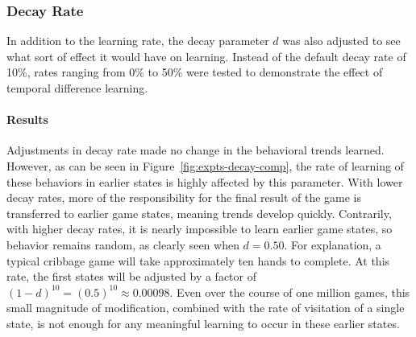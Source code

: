 
\subsubsection*{Decay Rate}
\label{sec:findings-expts-decay}

In addition to the learning rate,
the decay parameter $d$ was also adjusted to see what sort of effect it
would have on learning.
%
Instead of the default decay rate of 10\%,
rates ranging from 0\% to 50\%
were tested to demonstrate the effect of temporal difference learning.

\paragraph*{Results}

Adjustments in decay rate made no change in the behavioral trends learned.
%
However,
as can be seen in Figure~\ref{fig:expts-decay-comp},
the rate of learning of these behaviors in earlier states is highly affected
by this parameter.
%
With lower decay rates,
more of the responsibility for the final result of the game is transferred
to earlier game states,
meaning trends develop quickly.
%
Contrarily,
with higher decay rates,
it is nearly impossible to learn earlier game states,
so behavior remains random,
as clearly seen when $d = 0.50$.
%
For explanation,
a typical cribbage game will take approximately ten hands
to complete.
%
At this rate,
the first states will be adjusted by a factor of
$(1-d)^{10} = (0.5)^{10} \approx 0.00098$.
%
Even over the course of one million games,
this small magnitude of modification,
combined with the rate of visitation of a single state,
is not enough for any meaningful learning to occur
in these earlier states.



